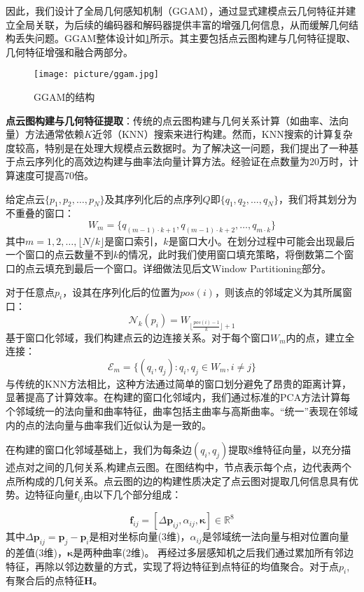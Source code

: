 \documentclass[preprint,12pt]{elsarticle}
\begin{document}
因此，我们设计了全局几何感知机制（GGAM），通过显式建模点云几何特征并建立全局关联，为后续的编码器和解码器提供丰富的增强几何信息，从而缓解几何结构丢失问题。GGAM整体设计如\cref{fig:ggam}所示。其主要包括点云图构建与几何特征提取、几何特征增强和融合两部分。
\begin{figure}[htbp]
	\centering
	\texttt{[image: picture/ggam.jpg]}
	\caption{GGAM的结构}
	\label{fig:ggam}
\end{figure}

\textbf{点云图构建与几何特征提取}：传统的点云图构建与几何关系计算（如曲率、法向量）方法通常依赖$K$近邻（KNN）搜索来进行构建。然而，KNN搜索的计算复杂度较高，特别是在处理大规模点云数据时。为了解决这一问题，我们提出了一种基于点云序列化的高效边构建与曲率法向量计算方法。经验证在点数量为20万时，计算速度可提高70倍。


给定点云$\{p_1, p_2, \ldots, p_N\}$及其序列化后的点序列$Q$即$\{q_1, q_2, \ldots, q_N\}$，我们将其划分为不重叠的窗口：
\begin{equation}
	W_m = \{q_{(m-1) \cdot k + 1}, q_{(m-1) \cdot k + 2}, \ldots, q_{m \cdot k}\}
\end{equation}
其中$m = 1, 2, \ldots, \lfloor N/k \rfloor$是窗口索引，$k$是窗口大小。在划分过程中可能会出现最后一个窗口的点云数量不到$k$的情况，此时我们使用窗口填充策略，将倒数第二个窗口的点云填充到最后一个窗口。详细做法见后文Window Partitioning部分。

对于任意点$p_i$，设其在序列化后的位置为$pos(i)$，则该点的邻域定义为其所属窗口：
\begin{equation}
	\mathcal{N}_k(p_i) = W_{\lfloor \frac{pos(i)-1}{k} \rfloor + 1}
\end{equation}
基于窗口化邻域，我们构建点云的边连接关系。对于每个窗口$W_m$内的点，建立全连接：
\begin{equation}
	\mathcal{E}_m = \{(q_i, q_j) : q_i, q_j \in W_m, i \neq j\}
\end{equation}
与传统的KNN方法相比，这种方法通过简单的窗口划分避免了昂贵的距离计算，显著提高了计算效率。在构建的窗口化邻域内，我们通过标准的PCA方法计算每个邻域统一的法向量和曲率特征，曲率包括主曲率与高斯曲率。“统一”表现在邻域内的点的法向量与曲率我们近似认为是一致的。


在构建的窗口化邻域基础上，我们为每条边$(q_i, q_j)$提取8维特征向量，以充分描述点对之间的几何关系,构建点云图。在图结构中，节点表示每个点，边代表两个点所构成的几何关系。点云图的边的构建性质决定了点云图对提取几何信息具有优势。边特征向量$\mathbf{f}_{ij}$由以下几个部分组成：
 
\begin{equation}
	\mathbf{f}_{ij} = [\Delta\mathbf{p}_{ij}, \alpha_{ij},  \boldsymbol{\kappa}] \in \mathbb{R}^8
\end{equation}
其中$\Delta\mathbf{p}_{ij} = \mathbf{p}_j - \mathbf{p}_i$是相对坐标向量(3维)，$\alpha_{ij}$是邻域统一法向量与相对位置向量的差值(3维)，$\boldsymbol{\kappa}$是两种曲率(2维)。
再经过多层感知机之后我们通过累加所有邻边特征，再除以邻边数量的方式，实现了将边特征到点特征的均值聚合。对于点$p_i$,有聚合后的点特征$\mathbf{H}$。
\end{document}
